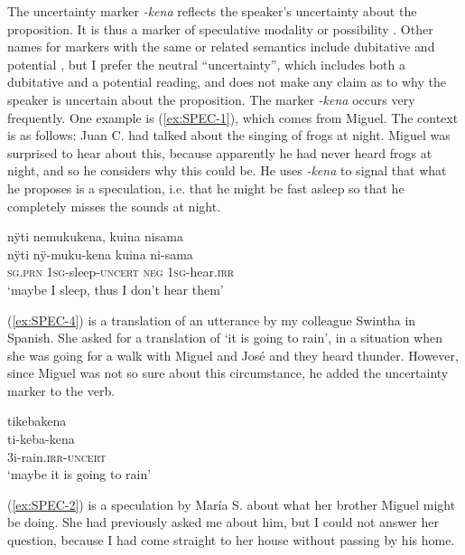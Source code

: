 The uncertainty marker \textit{-kena} reflects the speaker’s uncertainty about the proposition. It is thus a marker of speculative modality \citep[24--25]{Palmer2001} or possibility \citep[179]{Bybee_et_al1994}. Other names for markers with the same or related semantics include dubitative \citep[141]{Mueller2013} and potential \citep[149]{Mueller2013}, but I prefer the neutral “uncertainty”, which includes both a dubitative and a potential reading, and does not make any claim as to why the speaker is uncertain about the proposition. The marker \textit{-kena} occurs very frequently. One example is (\ref{ex:SPEC-1}), which comes from Miguel. %
The context is as follows: Juan C. had talked about the singing of frogs at night. Miguel was surprised to hear about this, because apparently he had never heard frogs at night, and so he considers why this could be. He uses \textit{-kena} to signal that what he proposes is a speculation, i.e. that he might be fast asleep so that he completely misses the sounds at night.

\ea\label{ex:SPEC-1}
\begingl 
\glpreamble nÿti nemukukena, kuina nisama\\
\gla nÿti nÿ-muku-kena kuina ni-sama\\ 
\textsc{sg.prn} 1\textsc{sg}-sleep-\textsc{uncert} \textsc{neg} 1\textsc{sg}-hear.\textsc{irr}\\ 
\glft ‘maybe I sleep, thus I don’t hear them’\\ 
\endgl
\trailingcitation{[mqx-p110826l.622]}
\xe

(\ref{ex:SPEC-4}) is a translation of an utterance by my colleague Swintha in Spanish. She asked for a translation of ‘it is going to rain’, in a situation when she was going for a walk with Miguel and José and they heard thunder. However, since Miguel was not so sure about this circumstance, he added the uncertainty marker to the verb.

\ea\label{ex:SPEC-4}
\begingl 
\glpreamble tikebakena\\
\gla ti-keba-kena\\ 
\glb 3i-rain.\textsc{irr}-\textsc{uncert}\\ 
\glft ‘maybe it is going to rain’\\ 
\endgl
\trailingcitation{[mox-c110926s-1.182]}%
\xe

(\ref{ex:SPEC-2}) is a speculation by María S. about what her brother Miguel might be doing. She had previously asked me about him, but I could not answer her question, because I had come straight to her house without passing by his home. 

